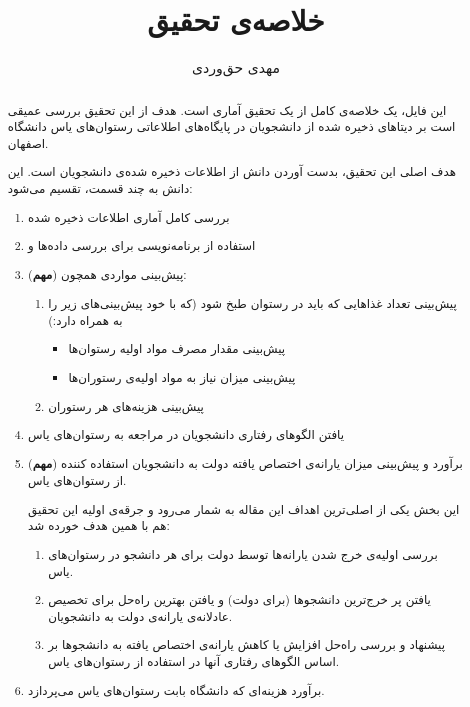 \documentclass{article}
\title{خلاصه‌ی تحقیق}
\author{مهدی حق‌وردی}
\begin{document}
\newcommand{\important}{{\tiny (\textbf{مهم}) }}
\maketitle
\tableofcontents

	\begin{abstract}
	این فایل،‌ یک خلاصه‌ی کامل از یک تحقیق آماری است. هدف از این تحقیق بررسی عمیقی است بر دیتا‌های ذخیره‌ شده‌ از دانشجویان در پایگاه‌‌های اطلاعاتی رستوان‌های یاس دانشگاه اصفهان.
	
	هدف اصلی این تحقیق،‌ بدست آوردن دانش از اطلاعات ذخیره‌ شده‌ی دانشجویان است. این دانش به چند قسمت، تقسیم می‌شود:
	\begin{enumerate}
		\item 
		بررسی کامل آماری اطلاعات ذخیره شده
		\item
		 استفاده از برنامه‌نویسی برای بررسی داده‌ها و 
		\item \important
		 پیش‌بینی مواردی همچون:
		\begin{enumerate}
			\item
			پیش‌بینی تعداد‌ غذا‌هایی که باید در رستوان طبخ شود (که با خود پیش‌بینی‌های زیر را به همراه دارد:)
			\begin{itemize}
			    \item 
			    پیش‌بینی مقدار مصرف مواد اولیه‌ رستوان‌ها
			    \item 
			    پیش‌بینی میزان نیاز به مواد اولیه‌ی رستوران‌‌ها
			\end{itemize}
		    \item 
		    پیش‌بینی هزینه‌های هر رستوران
		\end{enumerate}
	    \item یافتن الگو‌های رفتاری دانشجویان در مراجعه به رستوان‌‌های یاس
		\item \important
			برآورد و پیش‌بینی میزان یارانه‌ی اختصاص یافته‌ دولت به دانشجویان استفاده کننده از رستوان‌های یاس.
			
			این بخش یکی از اصلی‌ترین اهداف این مقاله به شمار می‌رود و جرقه‌ی اولیه این تحقیق هم با همین هدف خورده‌ شد:
		\begin{enumerate}
			\item 
			بررسی اولیه‌ی خرج‌ شدن یارانه‌ها توسط دولت برای هر دانشجو در رستوان‌های یاس.
			\item 
			یافتن پر خرج‌ترین دانشجو‌ها (برای دولت) و یافتن بهترین راه‌حل برای تخصیص  عادلانه‌ی یارانه‌ی دولت به دانشجویان.
			\item 
			پیشنهاد و بررسی راه‌حل افزایش یا کاهش یارانه‌ی اختصاص یافته به دانشجو‌ها بر اساس الگو‌های رفتاری آنها در استفاده از رستوان‌های یاس.
		\end{enumerate}
	    \item 
	    برآورد هزینه‌ای که دانشگاه بابت رستوان‌های یاس می‌پردازد.
	\end{enumerate}
	\end{abstract}
	
\end{document}

